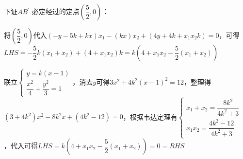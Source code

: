 \begin{enumerate}
\begin{jieda}
        下证$A{B}^{\prime }$ 必定经过的定点$\left(\dfrac{5}{2}, 0\right)$：

        将$\left(\dfrac{5}{2}, 0\right)$代入$\left(-y -5k+kx\right)x_1  - (kx)x_2 + \left(4y+4k+x_1x_2k\right) = 0$，可得$LHS = -\dfrac{5}{2}k(x_1+x_2)+(4+x_1x_2)k = k\left(4+x_1x_2-\dfrac{5}{2}(x_1+x_2)\right)$
        
        联立$\left\{\begin{array}{l}
             y = k(x-1) \\
             \dfrac{x^2}{4} + \dfrac{{y}^{2}}{3} = 1
        \end{array}\right.$，消去$y$可得$3x^2+4k^2(x-1)^2 = 12$，整理得$(3+4k^2)x^2-8k^2x+(4k^2-12) = 0$，根据韦达定理有$\left\{\begin{array}{l}
             x_1+x_2 = \dfrac{8k^2}{4k^2+3} \\
             x_1x_2 = \dfrac{4k^2-12}{4k^2+3}
        \end{array}\right.$，代入可得$LHS = k\left(4+x_1x_2-\dfrac{5}{2}(x_1+x_2)\right) = 0 = RHS$
    \end{jieda}
\end{enumerate}

